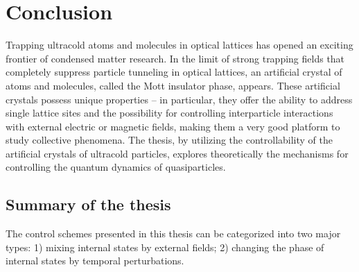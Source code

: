 \chapter{Conclusion}
\label{ch:conclusion}

Trapping ultracold atoms and molecules in optical lattices has opened an exciting frontier of condensed 
matter research\cite{Baranov2012}. In the limit of strong trapping fields that completely suppress particle tunneling
in optical lattices, an artificial crystal of atoms and molecules, called the Mott insulator phase, appears. These artificial crystals possess 
unique properties -- in particular, they offer  the ability to address single lattice sites\cite{atom-mott1, atom-mott2} and the possibility for controlling interparticle interactions with external electric or magnetic fields\cite{quemener2012, Baranov2012},  making them a very good platform to
study collective phenomena\cite{our-njp-review, quemener2012, Baranov2012}. The thesis, by utilizing  the controllability of the artificial crystals of ultracold particles, explores theoretically the mechanisms for  
controlling the quantum dynamics
of quasiparticles.  

\section{Summary of the thesis}

The control schemes presented in this thesis can be categorized into two major types: 1) mixing internal states by external fields; 2) changing the phase of internal states by temporal perturbations. 

